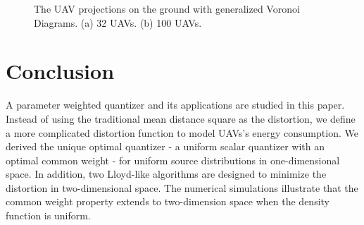 \documentclass[smallabstract,smallcaptions]{dccpaper}
\begin{document}
\begin{figure}[!htb]
\centering
{}
\hfil
{}
\captionsetup{justification=justified}
\caption{\small{The UAV projections on the ground with generalized Voronoi Diagrams. 
(a) 32 UAVs. (b) 100 UAVs.}}
\label{Distortion}
\end{figure}

\section{Conclusion}
%
A parameter weighted quantizer and its applications are studied in this paper. Instead of using the traditional mean
distance square as the distortion, we define a more complicated distortion function to model UAVs's energy consumption.
We derived the unique optimal quantizer - a uniform scalar quantizer with an optimal common weight - for uniform source
distributions in one-dimensional space.  In addition, two Lloyd-like algorithms are designed to minimize the distortion in
two-dimensional space.  The numerical simulations illustrate that the common weight property extends to two-dimension
space when the density function is uniform.
\end{document}
